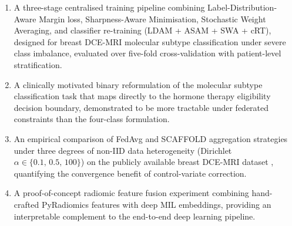 \begin{enumerate}

  \item[\textbf{C1.}] A three-stage centralised training pipeline combining
  Label-Distribution-Aware Margin loss, Sharpness-Aware Minimisation, Stochastic
  Weight Averaging, and classifier re-training (LDAM + ASAM + SWA + cRT), designed for
  breast DCE-MRI molecular subtype classification under severe class imbalance,
  evaluated over five-fold cross-validation with patient-level stratification.

  \item[\textbf{C2.}] A clinically motivated binary reformulation of the molecular
  subtype classification task that maps directly to the hormone therapy eligibility
  decision boundary, demonstrated to be more tractable under federated constraints
  than the four-class formulation.

  \item[\textbf{C3.}] An empirical comparison of FedAvg and SCAFFOLD aggregation
  strategies under three degrees of non-IID data heterogeneity
  (Dirichlet $\alpha \in \{0.1,\, 0.5,\, 100\}$) on the publicly available breast
  DCE-MRI dataset \cite{alves2023breastmri}, quantifying the convergence benefit
  of control-variate correction.

  \item[\textbf{C4.}] A proof-of-concept radiomic feature fusion experiment
  combining hand-crafted PyRadiomics features with deep MIL embeddings, providing
  an interpretable complement to the end-to-end deep learning pipeline.

\end{enumerate}
